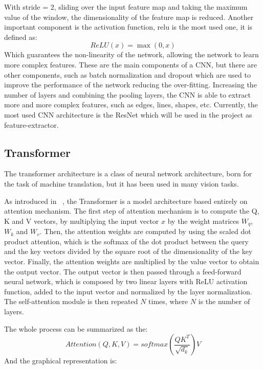 With stride = 2, sliding over the input feature map and taking the maximum value of the window, the dimensionality of the feature map is reduced.
Another important component is the activation function, \gls{relu} is the most used one, it is defined as:
\begin{equation}
    ReLU(x) = \max(0, x)
    \label{eq:expression-relu}
\end{equation}
Which guarantees the non-linearity of the network, allowing the network to learn more complex features.
These are the main components of a CNN, but there are other components, such as batch normalization and dropout which are used to improve the performance of the network reducing the over-fitting.
Increasing the number of layers and combining the pooling layers, the CNN is able to extract more and more complex features, such as edges, lines, shapes, etc.
Currently, the most used CNN architecture is the ResNet which will be used in the project as feature-extractor.

\subsection{Transformer}\label{subsec:transformer}
The transformer architecture is a class of neural network architecture, born for the task of machine translation, but it has been used in many vision tasks.

As introduced in ~\cite{transformer_paper}, the Transformer is a model architecture based entirely on attention mechanism.
The first step of attention mechanism is to compute the Q, K and V vectors, by multiplying the input vector $x$ by the weight matrices $W_q$, $W_k$ and $W_v$.
Then, the attention weights are computed by using the scaled dot product attention, which is the softmax of the dot product between the query and the key vectors divided by the square root of the dimensionality of the key vector.
Finally, the attention weights are multiplied by the value vector to obtain the output vector.
The output vector is then passed through a feed-forward neural network, which is composed by two linear layers with ReLU activation function, added to the input vector and normalized by the layer normalization.
The self-attention module is then repeated $N$ times, where $N$ is the number of layers.

The whole process can be summarized as the:
\begin{equation}
    Attention(Q, K, V) = softmax\left(\frac{QK^T}{\sqrt{d_k}}\right)V
    \label{eq:expression-scaled-dot-product}
\end{equation}
And the graphical representation is:

